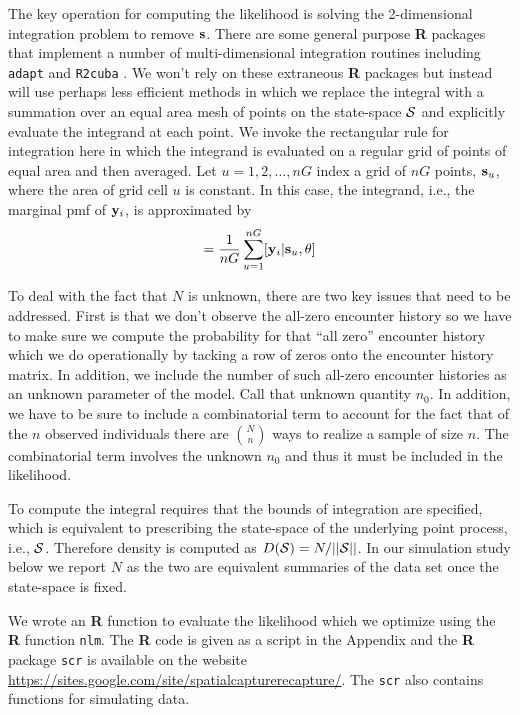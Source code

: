 \documentclass[12pt]{article}
\begin{document}
The key operation for computing the likelihood is solving the
2-dimensional integration problem to remove ${\bf s}$. There are some
general purpose {\bf R} packages that implement a number of
multi-dimensional integration routines including \mbox{\tt adapt}
\citep{genz_etal:2007} and \mbox{\tt R2cuba} \citep{hahn_etal:2011}.
We won't rely on these extraneous {\bf R} packages but instead will
use perhaps less efficient methods in which we replace the integral
with a summation over an equal area mesh of points on the state-space
${\cal S}$ and explicitly evaluate the integrand at each point. We
invoke the rectangular rule for integration here in which the
integrand is evaluated on a regular grid of points of equal area and
then averaged.  Let $u=1,2,\ldots,nG$ index a grid of $nG$ points,
${\bf s}_{u}$, where the area of grid cell $u$ is constant.  In this
case, the integrand, i.e., the marginal pmf of ${\bf y}_{i}$, is
approximated by
\begin{equation}
         [{\bf y}_{i}|\theta] = \frac{1}{nG} \sum_{u=1}^{nG}  [ {\bf
            y}_{i} |{\bf s}_u, \theta]
\label{mle.eq.intlik}
\end{equation}

To deal with the fact that $N$ is unknown,
there are two key issues that need to be addressed.
First is that
we don't observe the all-zero encounter history so we have to
make sure we compute the probability for that ``all zero'' encounter history which
we do operationally by tacking a row of zeros onto the encounter history matrix. In
addition, we include the number of such all-zero encounter histories
as an unknown parameter of the model. Call that unknown quantity $n_{0}$.
In addition, we have to be sure to include a combinatorial term to
account for the fact that of the $n$ observed individuals there are
${N \choose n}$
 ways to realize a sample of size $n$. The combinatorial term
involves the unknown $n_{0}$ and thus it must be included in the likelihood.

To compute the integral requires that the bounds of integration are
specified, which is equivalent to prescribing the state-space of the
underlying point process, i.e., ${\cal S}$. Therefore density is
computed as $D({\cal S}) = N/||{\cal S}||$. In our simulation study
below we report $N$ as the two are equivalent summaries of the data
set once the state-space is fixed.

We wrote an {\bf R} function to evaluate the likelihood which we optimize
using the {\bf R} function \mbox{\tt nlm}.
The {\bf R} code is given as a script in the Appendix and the {\bf R}
package \mbox{\tt scr}
is available on the website
\url{https://sites.google.com/site/spatialcapturerecapture/}. The
\mbox{\tt scr} also contains
functions for simulating data.
\end{document}
